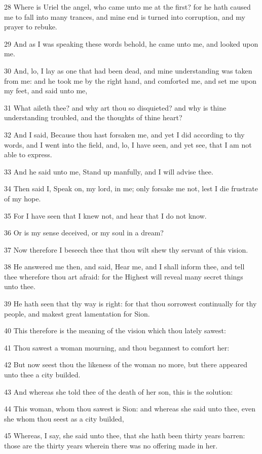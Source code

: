 \par 28 Where is Uriel the angel, who came unto me at the first? for he hath caused me to fall into many trances, and mine end is turned into corruption, and my prayer to rebuke.
\par 29 And as I was speaking these words behold, he came unto me, and looked upon me.
\par 30 And, lo, I lay as one that had been dead, and mine understanding was taken from me: and he took me by the right hand, and comforted me, and set me upon my feet, and said unto me,
\par 31 What aileth thee? and why art thou so disquieted? and why is thine understanding troubled, and the thoughts of thine heart?
\par 32 And I said, Because thou hast forsaken me, and yet I did according to thy words, and I went into the field, and, lo, I have seen, and yet see, that I am not able to express.
\par 33 And he said unto me, Stand up manfully, and I will advise thee.
\par 34 Then said I, Speak on, my lord, in me; only forsake me not, lest I die frustrate of my hope.
\par 35 For I have seen that I knew not, and hear that I do not know.
\par 36 Or is my sense deceived, or my soul in a dream?
\par 37 Now therefore I beseech thee that thou wilt shew thy servant of this vision.
\par 38 He answered me then, and said, Hear me, and I shall inform thee, and tell thee wherefore thou art afraid: for the Highest will reveal many secret things unto thee.
\par 39 He hath seen that thy way is right: for that thou sorrowest continually for thy people, and makest great lamentation for Sion.
\par 40 This therefore is the meaning of the vision which thou lately sawest:
\par 41 Thou sawest a woman mourning, and thou begannest to comfort her:
\par 42 But now seest thou the likeness of the woman no more, but there appeared unto thee a city builded.
\par 43 And whereas she told thee of the death of her son, this is the solution:
\par 44 This woman, whom thou sawest is Sion: and whereas she said unto thee, even she whom thou seest as a city builded,
\par 45 Whereas, I say, she said unto thee, that she hath been thirty years barren: those are the thirty years wherein there was no offering made in her.

